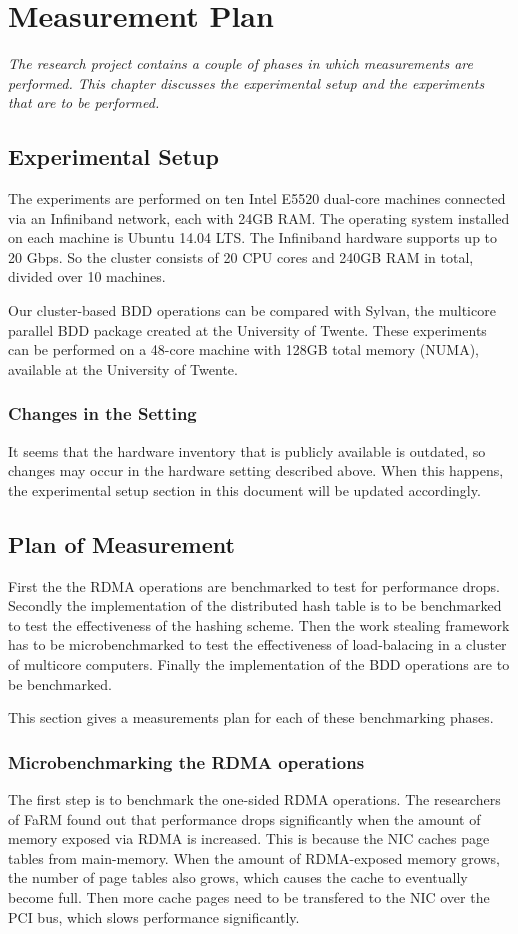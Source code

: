 \chapter{Measurement Plan}

\textit{The research project contains a couple of phases in which measurements are performed. This chapter discusses the experimental setup and the experiments that are to be performed.}

\section{Experimental Setup}
The experiments are performed on ten Intel E5520 dual-core machines connected via an Infiniband network, each with 24GB RAM. The operating system installed on each machine is Ubuntu 14.04 LTS. The Infiniband hardware supports up to 20 Gbps. So the cluster consists of 20 CPU cores and 240GB RAM in total, divided over 10 machines.

Our cluster-based BDD operations can be compared with Sylvan, the multicore parallel BDD package created at the University of Twente. These experiments can be performed on a 48-core machine with 128GB total memory (NUMA), available at the University of Twente. 

\subsection{Changes in the Setting}
It seems that the hardware inventory that is publicly available is outdated, so changes may occur in the hardware setting described above. When this happens, the experimental setup section in this document will be updated accordingly.

\section{Plan of Measurement}
First the the RDMA operations are benchmarked to test for performance drops. Secondly the implementation of the distributed hash table is to be benchmarked to test the effectiveness of the hashing scheme. Then the work stealing framework has to be microbenchmarked to test the effectiveness of load-balacing in a cluster of multicore computers. Finally the implementation of the BDD operations are to be benchmarked.

This section gives a measurements plan for each of these benchmarking phases.

\subsection{Microbenchmarking the RDMA operations}
The first step is to benchmark the one-sided RDMA operations. The researchers of FaRM \cite{farm} found out that performance drops significantly when the amount of memory exposed via RDMA is increased. This is because the NIC caches page tables from main-memory. When the amount of RDMA-exposed memory grows, the number of page tables also grows, which causes the cache to eventually become full. Then more cache pages need to be transfered to the NIC over the PCI bus, which slows performance significantly. 

